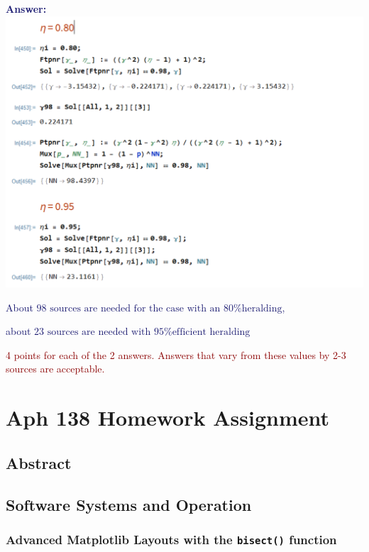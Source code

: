 \documentclass[11pt]{caltech_thesis} %
\begin{document}
\begin{enumerate}
  \textcolor{midnightblue}{ \textbf{Answer:} }
  \textcolor{midnightblue}{\includegraphics{chapter_05/figs_05/pnrTotalPerf.PNG}}

  \textcolor{midnightblue}{About
  \(\boxed{\text{98 sources are needed for the case with an 80\% heralding}}\),
  }

  \textcolor{midnightblue}{about
  \(\boxed{\text{23 sources are needed with 95\% efficient heralding}}\)}

  \textcolor{darkred}{ 4 points for each of the 2 answers. Answers that
  vary from these values by 2-3 sources are acceptable. }
\end{enumerate}

\hypertarget{aph-138-homework-assignment}{%
\chapter{Aph 138 Homework
Assignment}\label{aph-138-homework-assignment}}

\hypertarget{abstract-4}{%
\section{Abstract}\label{abstract-4}}

\hypertarget{software-systems-and-operation}{%
\section{Software Systems and
Operation}\label{software-systems-and-operation}}

\hypertarget{advanced-matplotlib-layouts-with-the-bisect-function}{%
\subsection{\texorpdfstring{Advanced Matplotlib Layouts with the
\texttt{bisect()}
function}{Advanced Matplotlib Layouts with the bisect() function}}\label{advanced-matplotlib-layouts-with-the-bisect-function}}
\end{document}
